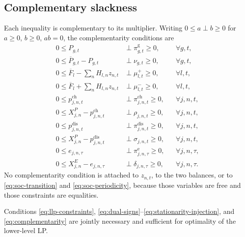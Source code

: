 \documentclass[11pt,a4paper,fleqn]{article}
\numberwithin{equation}{section}
\begin{document}
\subsection{Complementary slackness}

Each inequality is complementary to its multiplier. Writing
$0\leq a\perp b\geq 0$ for $a\geq 0$, $b\geq 0$, $ab=0$, the complementarity
conditions are
\begin{subequations}\label{eq:complementarity}
\begin{align}
0\leq P_{g,t}
&\perp \pi^{\mathrm{g}}_{g,t}\geq 0,
&& \forall g,t,
\label{eq:cs-generation-variable}\\
0\leq \overline P_{g,t}-P_{g,t}
&\perp \nu_{g,t}\geq 0,
&& \forall g,t,
\label{eq:cs-generation-bound}\\
0\leq \overline F_l-\sum_n H_{l,n}z_{n,t}
&\perp \mu^+_{l,t}\geq 0,
&& \forall l,t,
\label{eq:cs-line-forward}\\
0\leq \overline F_l+\sum_n H_{l,n}z_{n,t}
&\perp \mu^-_{l,t}\geq 0,
&& \forall l,t,
\label{eq:cs-line-reverse}\\
0\leq p^{\mathrm{ch}}_{j,n,t}
&\perp \pi^{\mathrm{ch}}_{j,n,t}\geq 0,
&& \forall j,n,t,
\label{eq:cs-charge-variable}\\
0\leq X^P_{j,n}-p^{\mathrm{ch}}_{j,n,t}
&\perp \rho_{j,n,t}\geq 0,
&& \forall j,n,t,
\label{eq:cs-charge-bound}\\
0\leq p^{\mathrm{dis}}_{j,n,t}
&\perp \pi^{\mathrm{dis}}_{j,n,t}\geq 0,
&& \forall j,n,t,
\label{eq:cs-discharge-variable}\\
0\leq X^P_{j,n}-p^{\mathrm{dis}}_{j,n,t}
&\perp \sigma_{j,n,t}\geq 0,
&& \forall j,n,t,
\label{eq:cs-discharge-bound}\\
0\leq e_{j,n,\tau}
&\perp \pi^{\mathrm{e}}_{j,n,\tau}\geq 0,
&& \forall j,n,\tau,
\label{eq:cs-soc-variable}\\
0\leq X^E_{j,n}-e_{j,n,\tau}
&\perp \delta_{j,n,\tau}\geq 0,
&& \forall j,n,\tau.
\label{eq:cs-soc-bound}
\end{align}
\end{subequations}
No complementarity condition is attached to $z_{n,t}$, to the two balances, or
to \eqref{eq:soc-transition} and \eqref{eq:soc-periodicity}, because those
variables are free and those constraints are equalities.

Conditions \eqref{eq:llp-constraints},
\eqref{eq:dual-signs}--\eqref{eq:stationarity-injection}, and
\eqref{eq:complementarity} are jointly necessary and sufficient for optimality
of the lower-level LP.
\end{document}
